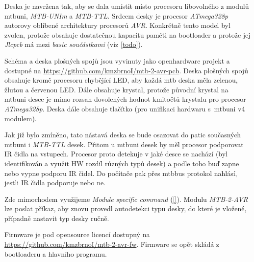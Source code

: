 Deska je navržena tak, aby se dala umístit místo procesoru libovolného z modulů
\gls{mtbuni}, \textit{MTB-UNIm} a \textit{MTB-TTL}. Srdcem desky je procesor
\textit{ATmega328p} autorovy oblíbené architektury procesorů \textit{AVR}.
Konkrétně tento model byl zvolen, protože obsahuje dostatečnou kapacitu paměti
na bootloader a protože jej \textit{Jlcpcb} má mezi \textit{basic součástkami}
(viz \ref{todo}).

Schéma a deska plošných spojů jsou vyvinuty jako openhardware projekt a dostupné
na \url{https://github.com/kmzbrnoI/mtb-2-avr-pcb}. Deska plošných spojů obsahuje
kromě procesoru chybějící LED, aby každá \gls{mtb} deska měla zelenou, žlutou a
červenou LED. Dále obsahuje krystal, protože původní krystal na \gls{mtbuni}
desce je mimo rozsah dovolených hodnot kmitočtů krystalu pro procesor
\textit{ATmega328p}. Deska dále obsahuje tlačítko (pro unifikaci hardwaru
s~\gls{mtbuni} v4 modulem).

Jak již bylo zmíněno, tato nástavá deska se bude osazovat do patic současných
\gls{mtbuni} i \textit{MTB-TTL} desek. Přitom u \gls{mtbuni} desek by měl procesor
podporovat IR čidla na vstupech. Procesor proto detekuje v jaké desce se nachází
(byl identifikován a využit HW rozdíl různých typů desek) a podle toho buď
zapne nebo vypne podporu IR čidel. Do počítače pak přes \gls{mtbbus} protokol
nahlásí, jestli IR čidla podporuje nebo ne.

Zde mimochodem využijeme \textit{Module specific command} (\ref{}). Modulu
\textit{MTB-2-AVR} lze poslat příkaz, aby znovu provedl autodetekci typu
desky, do které je vložené, případně nastavit typ desky ručně.

Firmware je pod opensource licencí dostupný na
\url{https://github.com/kmzbrnoI/mtb-2-avr-fw}. Firmware se opět skládá
z bootloaderu a hlavního programu.
